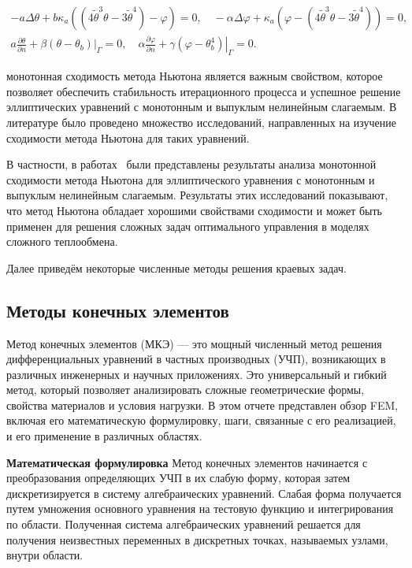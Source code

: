 \[
    \begin{gathered}
        -a \Delta \theta+b \kappa_{a}\left(\left(4 \widetilde{\theta}^{3}
        \theta-3 \widetilde{\theta}^{4}\right)-\varphi\right)=0,
        \quad-\alpha \Delta \varphi
        +\kappa_{a}\left(\varphi
        -\left(4 \widetilde{\theta}^{3}
        \theta-3 \widetilde{\theta}^{4}\right)\right)=0, \\
        a \frac{\partial \theta}{\partial n}
        +\left.\beta\left(\theta-\theta_{b}\right)\right|_{\Gamma}=0,
        \quad \alpha \frac{\partial \varphi}{\partial n}
        +\left.\gamma\left(\varphi-\theta_{b}^{4}\right)\right|_{\Gamma}=0.
    \end{gathered}
\]

монотонная сходимость метода Ньютона является важным свойством,
которое позволяет обеспечить стабильность итерационного процесса
и успешное решение эллиптических уравнений
с монотонным и выпуклым нелинейным слагаемым.
В литературе было проведено множество исследований, направленных
на изучение сходимости метода Ньютона для таких уравнений.

В частности, в работах~\cite{Mukhamadiev1971, Schryer1971} были представлены
результаты анализа монотонной сходимости метода Ньютона для эллиптического
уравнения с монотонным и выпуклым нелинейным слагаемым.
Результаты этих исследований показывают, что метод Ньютона обладает
хорошими свойствами сходимости и может быть применен для решения
сложных задач оптимального управления в моделях сложного теплообмена.

Далее приведём некоторые численные методы решения краевых задач.

\subsection{Методы конечных элементов}
\label{subsec:ch4/sec1/fem}

Метод конечных элементов (МКЭ) — это мощный численный метод решения
дифференциальных уравнений в частных производных (УЧП), возникающих
в различных инженерных и научных приложениях.
Это универсальный и гибкий метод, который позволяет анализировать
сложные геометрические формы, свойства материалов и условия нагрузки.
В этом отчете представлен обзор FEM, включая его математическую
формулировку, шаги, связанные с его реализацией,
и его применение в различных областях.

\textbf{Математическая формулировка}
Метод конечных элементов начинается с преобразования определяющих
УЧП в их слабую форму, которая затем дискретизируется
в систему алгебраических уравнений.
Слабая форма получается путем умножения основного уравнения
на тестовую функцию и интегрирования по области.
Полученная система алгебраических уравнений решается для получения
неизвестных переменных в дискретных точках,
называемых узлами, внутри области.



